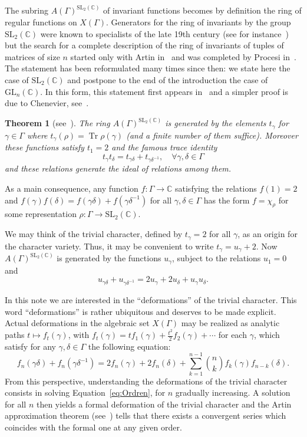 \documentclass[11pt]{article}
\newtheorem{theorem}{Theorem}[section]
\theoremstyle{definition}
\newcommand{\CC}{\mathbb{C}}
\newcommand{\tr}{\operatorname{Tr}}
\newcommand{\SL}{\mathrm{SL}}
\newcommand{\GL}{\mathrm{GL}}
\begin{document}
The subring $A(\Gamma)^{\SL_2(\CC)}$ of invariant functions becomes by
definition the ring of regular functions on $X(\Gamma)$. Generators for
the ring of invariants by the group $\SL_2(\CC)$ were known to
specialists of the late 19th century (see for instance~\cite{GraceYoung})
but the search for a complete description of the ring of invariants of
tuples of matrices of size $n$ started only with Artin in~\cite{Artin69}
and was completed by Procesi in~\cite{Procesi}.
The statement has been reformulated many times since then: we state here
the case of $\SL_2(\CC)$ and postpone to the end of the introduction the
case of~$\GL_n(\CC)$.
In this form, this statement first appears
in~\cite[Prop.\,9.1]{BrumfielHilden}
and a simpler proof is due to Chenevier,
see~\cite[Prop.\,2.3]{ChenevierHab}.
\begin{theorem}[see~\cite{BrumfielHilden,
ChenevierHab}]\label{theo:procesi}
The ring $A(\Gamma)^{\SL_2(\CC)}$ is generated by the elements $t_\gamma$
for $\gamma\in \Gamma$ where $t_\gamma(\rho)=\tr \rho(\gamma)$
(and a finite number of them suffice).
Moreover these functions satisfy $t_1=2$ and the famous trace identity
\[ t_\gamma t_\delta=t_{\gamma\delta}+t_{\gamma\delta^{-1}},\quad
\forall \gamma,\delta\in \Gamma \]
and these relations generate the ideal of relations among them.
\end{theorem}
As a main consequence, any function $f\colon\Gamma\to \CC$ satisfying the
relations $f(1)=2$ and
$f(\gamma)f(\delta)=f(\gamma\delta)+f(\gamma\delta^{-1})$ for all
$\gamma,\delta\in \Gamma$ has the form $f=\chi_\rho$ for some
representation $\rho\colon\Gamma\to \SL_2(\CC)$.

We may think of the trivial character, defined by $t_\gamma=2$ for all
$\gamma$, as an origin for the character variety. Thus, it may be convenient
to write $t_\gamma=u_\gamma+2$. Now $A(\Gamma)^{\SL_2(\CC)}$ is generated by
the functions $u_\gamma$, subject to the relations $u_1=0$ and
\begin{equation}\label{eq:u}
u_{\gamma\delta}+u_{\gamma\delta^{-1}}=
2u_\gamma+2u_\delta+u_\gamma u_\delta.
\end{equation}

In this note we are interested in the ``deformations'' of the trivial
character. This word ``deformations'' is rather ubiquitous and deserves to
be made explicit. Actual deformations in the algebraic set $X(\Gamma)$
may be realized as analytic paths $t\mapsto f_t(\gamma)$, with
$f_t(\gamma)=tf_1(\gamma)+\frac{t^2}{2}f_2(\gamma)+\cdots$ for each
$\gamma$, which satisfy for any $\gamma,\delta\in \Gamma$ the following
equation:
\begin{equation}\label{eq:Ordren}
f_n(\gamma\delta)+f_n(\gamma\delta^{-1})=2f_n(\gamma)+2f_n(\delta)+
\sum_{k=1}^{n-1}\binom{n}{k}f_k(\gamma)f_{n-k}(\delta).
\end{equation}
From this perspective, understanding the deformations of the trivial
character consists in solving Equation~\eqref{eq:Ordren},
for $n$ gradually increasing. A solution for all $n$ then yields a
formal deformation of the trivial character and the Artin approximation
theorem (see~\cite{Artin}) tells that there exists a convergent series which
coincides with the formal one at any given order.
\end{document}
